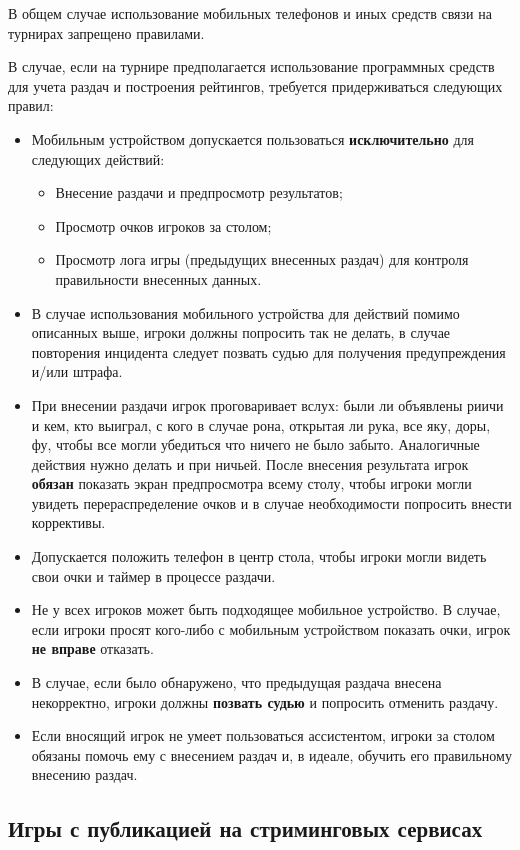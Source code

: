 В общем случае использование мобильных телефонов и иных средств связи на турнирах запрещено правилами.

В случае, если на турнире предполагается использование программных средств для учета раздач и построения рейтингов, требуется придерживаться следующих правил:

\begin{itemize}
	\item Мобильным устройством допускается пользоваться \textbf{исключительно} для следующих действий:
	\begin{itemize}
		\item Внесение раздачи и предпросмотр результатов;
		\item Просмотр очков игроков за столом;
		\item Просмотр лога игры (предыдущих внесенных раздач) для контроля правильности внесенных данных.
	\end{itemize}
	\item В случае использования мобильного устройства для действий помимо описанных выше, игроки должны попросить так не делать, в случае повторения инцидента следует позвать судью для получения предупреждения и/или штрафа.
	\item При внесении раздачи игрок проговаривает вслух: были ли объявлены риичи и кем, кто выиграл, с кого в случае рона, открытая ли рука, все яку, доры, фу, чтобы все могли убедиться что ничего не было забыто. Аналогичные действия нужно делать и при ничьей. После внесения результата игрок \textbf{обязан} показать экран предпросмотра всему столу, чтобы игроки могли увидеть перераспределение очков и в случае необходимости попросить внести коррективы.
	\item Допускается положить телефон в центр стола, чтобы игроки могли видеть свои очки и таймер в процессе раздачи.
	\item Не у всех игроков может быть подходящее мобильное устройство. В случае, если игроки просят кого-либо с мобильным устройством показать очки, игрок \textbf{не вправе} отказать.
	\item В случае, если было обнаружено, что предыдущая раздача внесена некорректно, игроки должны \textbf{позвать судью} и попросить отменить раздачу.
	\item Если вносящий игрок не умеет пользоваться ассистентом, игроки за столом обязаны помочь ему с внесением раздач и, в идеале, обучить его правильному внесению раздач.
\end{itemize}

\subsection{Игры с публикацией на стриминговых сервисах}


